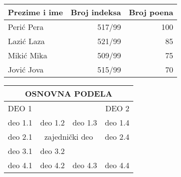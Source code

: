 \documentclass{article}
\begin{document}
\begin{tabular}{|l|r|r|}
\hline
Prezime i ime & Broj indeksa & Broj poena \\
\hline
Perić Pera & 517/99 & 100 \\
Lazić Laza & 521/99 & 85 \\
Mikić Mika & 509/99 & 75 \\
Jović Jova & 515/99 & 70 \\
\hline
\end{tabular}

\vspace*{1cm}
\begin{tabular}{|c|c||c|c|} \hline
\multicolumn{4}{|c|}{OSNOVNA PODELA} \\ \hline
\multicolumn{2}{|l||}{DEO 1} & \multicolumn{2}{|r|}{DEO 2} \\
\hline deo 1.1 & deo 1.2 & deo 1.3 & deo 1.4 \\ \hline
deo 2.1 & \multicolumn{2}{c|}{zajednički deo} & deo 2.4 \\
\hline deo 3.1 & deo 3.2 & & \\ \cline{1-2}
deo 4.1 & deo 4.2 & deo 4.3 & deo 4.4 \\ \hline
\end{tabular}
\end{document}
